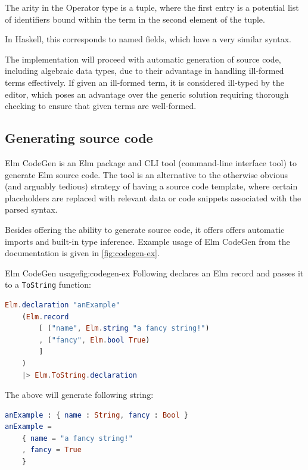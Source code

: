 The arity in the Operator type is a tuple, where the first entry is a potential
list of identifiers bound within the term in the second element of the tuple.

In Haskell, this corresponds to named fields\cite{haskell-records-named-fields},
which have a very similar syntax.

The implementation will proceed with automatic generation of source code,
including algebraic data types, due to their advantage in handling ill-formed
terms effectively. If given an ill-formed term, it is considered ill-typed by
the editor, which poses an advantage over the generic solution requiring
thorough checking to ensure that given terms are well-formed.

\subsection{Generating source code}
Elm CodeGen\cite{elm-codegen-package} is an Elm package and
CLI tool (command-line interface tool) to generate Elm source code.
The tool is an alternative to the otherwise obvious (and arguably tedious)
strategy of having a source code template, where certain placeholders are
replaced with relevant data or code snippets associated with the parsed syntax.

Besides offering the ability to generate source code, it offers offers automatic
imports and built-in type inference. Example usage of Elm CodeGen from
the documentation\cite{elm-codegen-package} is given in \cref{fig:codegen-ex}.

\begin{myfigure}{Elm CodeGen usage}{fig:codegen-ex}
  Following declares an Elm record and passes it to a \texttt{ToString} function:

  \begin{lstlisting}[backgroundcolor=\color{myfigurecolorback},language=elm]
Elm.declaration "anExample"
    (Elm.record
        [ ("name", Elm.string "a fancy string!")
        , ("fancy", Elm.bool True)
        ]
    )
    |> Elm.ToString.declaration
\end{lstlisting}

  The above will generate following string:
  \begin{lstlisting}[backgroundcolor=\color{myfigurecolorback},language=elm]
anExample : { name : String, fancy : Bool }
anExample =
    { name = "a fancy string!"
    , fancy = True
    }
\end{lstlisting}
\end{myfigure}

